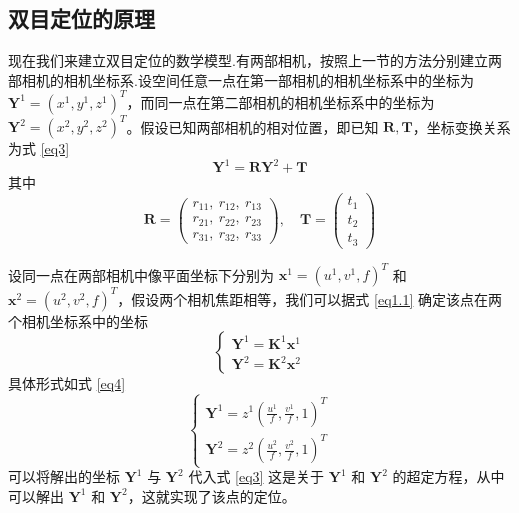 \documentclass{article}
\numberwithin{equation}{section}						%
\numberwithin{figure}{section}							%
\begin{document}
\begin{sloppypar}
	\subsection{双目定位的原理}
	现在我们来建立双目定位的数学模型.有两部相机，按照上一节的方法分别建立两部相机的相机坐标系.设空间任意一点在第一部相机的相机坐标系中的坐标为 ${\bm Y^1} = (x^1, y^1, z^1)^T$，而同一点在第二部相机的相机坐标系中的坐标为 ${\bm Y^2}=(x^2, y^2, z^2)^T$。假设已知两部相机的相对位置，即已知 ${\bm R}, {\bm T}$，坐标变换关系为式 \ref{eq3}
	\begin{equation}
		{\bm Y^1} = {\bm R}{\bm Y^2} + {\bm T}
		\label{eq3}
	\end{equation}
	其中
	\begin{equation}
		{\bm R} = \left( 
		\begin{aligned}
			r_{11},\ r_{12},\ r_{13} \\
			r_{21},\ r_{22},\ r_{23} \\
			r_{31},\ r_{32},\ r_{33}
		\end{aligned}
		\right), \quad {\bm T} = \left(
		\begin{aligned}
			t_{1} \\
			t_{2} \\
			t_{3}
		\end{aligned}
		\right)
	\end{equation}
	
	设同一点在两部相机中像平面坐标下分别为 ${\bm x^1} = (u^1, v^1, f)^T$ 和 ${\bm x^2} = (u^2, v^2, f)^T$，假设两个相机焦距相等，我们可以据式 \ref{eq1.1} 确定该点在两个相机坐标系中的坐标
	\begin{equation}
		\left\{
		\begin{aligned}
			{\bm Y^1} = {\bm K^1}{\bm x^1} \\
			{\bm Y^2} = {\bm K^2}{\bm x^2}
		\end{aligned}
		\right.
	\end{equation}
	具体形式如式 \ref{eq4}
	\begin{equation}
		\left\{
		\begin{aligned}
			{\bm Y^1} = z^1(\frac{u^1}{f}, \frac{v^1}{f}, 1)^T \\
			{\bm Y^2} = z^2(\frac{u^2}{f}, \frac{v^2}{f}, 1)^T
		\end{aligned}
		\right.
		\label{eq4}
	\end{equation}
	可以将解出的坐标 $\bm Y^1$ 与 $\bm Y^2$ 代入式 \ref{eq3} 这是关于 $\bm Y^1$ 和 $\bm Y^2$ 的超定方程，从中可以解出 $\bm Y^1$ 和 $\bm Y^2$，这就实现了该点的定位。
	

\end{sloppypar}
\end{document}
